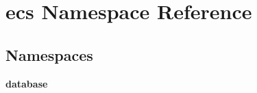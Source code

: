 \section{ecs Namespace Reference}
\label{namespaceecs}
\subsection*{Namespaces}
\begin{DoxyCompactItemize}
\item 
 {\bf database}
\end{DoxyCompactItemize}
